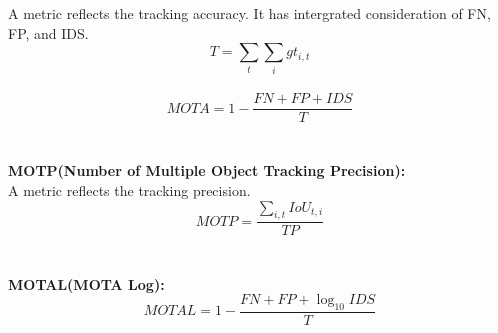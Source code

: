                 A metric reflects the tracking accuracy. It has intergrated consideration of FN, FP, and IDS.\\
                $$T=\sum_t \sum_i gt_{i,t}$$\\
                $$MOTA=1 - \frac{FN + FP + IDS}{T}$$\\
                \\\textbf{MOTP(Number of Multiple Object Tracking Precision):}\\
                A metric reflects the tracking precision. \\
                $$MOTP=\frac{\sum_{i,t}IoU_{t, i}}{TP}$$\\
                \\\textbf{MOTAL(MOTA Log):}\\
                $$MOTAL= 1 - \frac{FN + FP + \log_{10}IDS}{T}$$ 

        